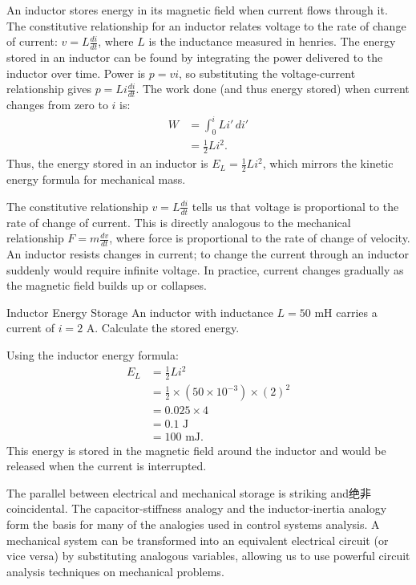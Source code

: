 An inductor stores energy in its magnetic field when current flows through it. The constitutive relationship for an inductor relates voltage to the rate of change of current: $v = L\frac{di}{dt}$, where $L$ is the inductance measured in henries. The energy stored in an inductor can be found by integrating the power delivered to the inductor over time. Power is $p = vi$, so substituting the voltage-current relationship gives $p = L i \frac{di}{dt}$. The work done (and thus energy stored) when current changes from zero to $i$ is:
\begin{align}
W &= \int_0^i L i' \, di' \\
  &= \frac{1}{2}Li^2 .
\end{align}
Thus, the energy stored in an inductor is $E_L = \frac{1}{2}Li^2$, which mirrors the kinetic energy formula for mechanical mass.

The constitutive relationship $v = L\frac{di}{dt}$ tells us that voltage is proportional to the rate of change of current. This is directly analogous to the mechanical relationship $F = m\frac{dv}{dt}$, where force is proportional to the rate of change of velocity. An inductor resists changes in current; to change the current through an inductor suddenly would require infinite voltage. In practice, current changes gradually as the magnetic field builds up or collapses.

\begin{example}{Inductor Energy Storage}
An inductor with inductance $L = 50$ mH carries a current of $i = 2$ A. Calculate the stored energy.

Using the inductor energy formula:
\begin{align}
E_L &= \frac{1}{2}Li^2 \\
    &= \frac{1}{2} \times (50 \times 10^{-3}) \times (2)^2 \\
    &= 0.025 \times 4 \\
    &= 0.1 \text{ J} \\
    &= 100 \text{ mJ}.
\end{align}
This energy is stored in the magnetic field around the inductor and would be released when the current is interrupted.
\end{example}

The parallel between electrical and mechanical storage is striking and绝非 coincidental. The capacitor-stiffness analogy and the inductor-inertia analogy form the basis for many of the analogies used in control systems analysis. A mechanical system can be transformed into an equivalent electrical circuit (or vice versa) by substituting analogous variables, allowing us to use powerful circuit analysis techniques on mechanical problems.

